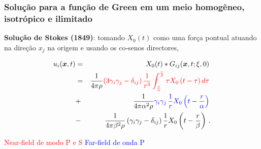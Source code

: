 \documentclass{beamer}
\newcommand{\xvec}{\vc{x}}
\newcommand{\xivec}{\boldmath \xi}
\begin{document}
\begin{frame}
	\frametitle{\textbf{Solu\c{c}\~ao para a fun\c{c}\~ao de Green em um meio homog\^eneo, isotr\'opico e ilimitado}}
	
	\begin{flushleft}
		\textbf{Solu\c{c}\~ao de Stokes (1849)}: tomando $X_{0}(t)$ como uma for\c{c}a pontual atuando na dire\c{c}\~ao $x_j$ na origem e usando os co-senos 
		directores,
	\end{flushleft}
	\begin{eqnarray*}
		\label{ten1}
		u_i(\xvec,t) &=& X_{0}(t) * G_{ij}(\xvec,t;\xivec,0)\, \\
		&=&\frac{1}{4\pi\rho} \textcolor{red}{\left(3\gamma_i\gamma_j -\delta_{ij} \right) \frac{1}{r^3}  \int_{ \frac{r }{\alpha}}^{ \frac{r}{\beta}} \tau X_{0}\left( t -\tau \right)  d\tau }\, \\      
		&+&\frac{1}{4\pi\alpha^2\rho} \textcolor{blue}{\gamma_i\gamma_j\, \frac{1}{r}  X_{0}\left(t - \frac{r}{\alpha} \right) }\, \\
		&-&\frac{1}{4\pi\beta^2\rho} \left(\gamma_i\gamma_j -\delta_{ij} \right)  \frac{1}{r}  X_{0}\left(t - \frac{r}{\beta} \right)\, .
	\end{eqnarray*}
	\begin{flushleft}
		\textcolor{red}{Near-field de modo P e S}\hspace{0.5cm}
		\textcolor{blue}{Far-field de onda P}
	\end{flushleft}
\end{frame}%
\end{document}
